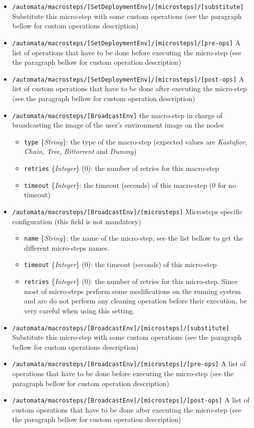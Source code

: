 \documentclass[a4wide,10pt,oneside]{book}
\newcommand{\ypath}[1]{\texttt{#1}}
\newcommand{\yfield}[2]{\texttt{#1} {\small\{{\emph{#2}}\}}:}
\newcommand{\yfieldd}[3]{\texttt{#1} {\small\{{\emph{#2}}\}} {\small(}#3{\small)}:}
\begin{document}
\begin{itemize}
\begin{itemize}
  \end{itemize}
  \item \ypath{/automata/macrosteps/[SetDeploymentEnv]/[microsteps]/[substitute]} Substitute this micro-step with some custom operations (see the paragraph bellow for custom operations description)
  \item \ypath{/automata/macrosteps/[SetDeploymentEnv]/[microsteps]/[pre-ops]} A list of operations that have to be done before executing the micro-step (see the paragraph bellow for custom operation description)
  \item \ypath{/automata/macrosteps/[SetDeploymentEnv]/[microsteps]/[post-ops]} A list of custom operations that have to be done after executing the micro-step (see the paragraph bellow for custom operation description)


  \item \ypath{/automata/macrosteps/[BroadcastEnv]} the macro-step in charge of broadcasting the image of the user's environment image on the nodes
  \begin{itemize}
    \item \yfield{type}{String} the type of the macro-step (expected values are \emph{Kastafior}, \emph{Chain}, \emph{Tree}, \emph{Bittorrent} and \emph{Dummy})
    \item \yfieldd{retries}{Integer}{0} the number of retries for this macro-step
    \item \yfield{timeout}{Integer} the timeout (seconds) of this macro-step (0 for no timeout)
  \end{itemize}
  \item \ypath{/automata/macrosteps/[BroadcastEnv]/[microsteps]} Microsteps specific configuration (this field is not mandatory)
  \begin{itemize}
    \item \yfield{name}{String} the name of the micro-step, see the list bellow to get the different micro-steps names.
    \item \yfieldd{timeout}{Integer}{0} the timeout (seconds) of this micro-step
    \item \yfieldd{retries}{Integer}{0} the number of retries for this micro-step. Since most of micro-steps perform some modifications on the running system and are do not perform any cleaning operation before their execution, be very careful when using this setting.
  \end{itemize}
  \item \ypath{/automata/macrosteps/[BroadcastEnv]/[microsteps]/[substitute]} Substitute this micro-step with some custom operations (see the paragraph bellow for custom operations description)
  \item \ypath{/automata/macrosteps/[BroadcastEnv]/[microsteps]/[pre-ops]} A list of operations that have to be done before executing the micro-step (see the paragraph bellow for custom operation description)
  \item \ypath{/automata/macrosteps/[BroadcastEnv]/[microsteps]/[post-ops]} A list of custom operations that have to be done after executing the micro-step (see the paragraph bellow for custom operation description)



\end{itemize}
\end{document}
